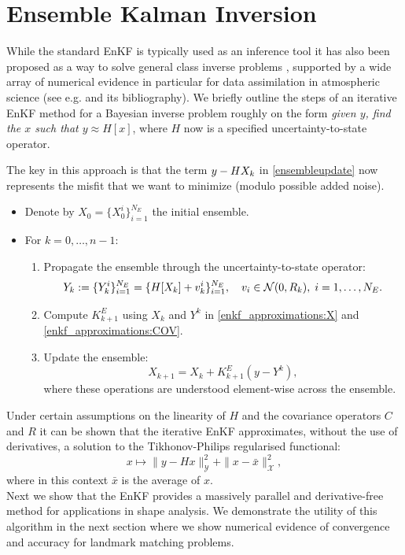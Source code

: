 \section{Ensemble Kalman Inversion}

While the standard EnKF is typically used as an inference tool it has also been proposed as a way to 
solve general class inverse problems
\cite{oliver2008inverse,iglesias2013ensemble,iglesias2016regularizing,chada2018parameterizations,schillings2017analysis}, supported by a wide array of numerical evidence in particular for data assimilation in atmospheric science (see e.g. \cite{schneider2017earth} and its bibliography). We briefly outline the steps of an iterative EnKF method for a Bayesian inverse problem roughly on the form \emph{given $y$, find the $x$ such that $y \approx H[x]$}, where $H$ now is a specified uncertainty-to-state operator. {The key in this approach is that the term $y - H X_k$ in \eqref{ensembleupdate} now represents the misfit that we want to minimize (modulo possible added noise).
\begin{itemize}
    \item Denote by $X_0 = \{X_0^i\}_{i=1}^{N_E}$ the initial ensemble.
    \item For $k=0,\ldots,n-1$:
\begin{enumerate}
    \item Propagate the ensemble through the uncertainty-to-state operator:
    \begin{align} Y_k := \{Y_k^i\}_{i=1}^{N_E} = \{H[X_k] + v_k^i\}_{i=1}^{N_E}, \quad v_i \in \mathcal{N}(0, R_k),\; i=1,\ldots,N_E.\label{eq:Yk}
    \end{align}
    \item Compute $K_{k+1}^E$ using $X_k$ and $Y^k$ in \eqref{enkf_approximations:X} and \eqref{enkf_approximations:COV}.
    \item Update the ensemble: \[ X_{k+1} = X_k + K_{k+1}^E (y - Y^k),\] where these operations are understood element-wise across the ensemble.
\end{enumerate}
\end{itemize}
}
Under certain assumptions on the linearity of $H$ and the covariance operators $C$ and $R$ it can be shown \cite[Section 2.6]{iglesias2013ensemble} that the iterative EnKF approximates, without the use of derivatives, a solution to the Tikhonov-Philips \cite{vogel2002computational} regularised functional:
\[
x\mapsto \| y - H x \|_\mathcal{Y}^2 + \| x - \bar{x} \|_\mathcal{X}^2,
\]
where in this context $\bar{x}$ is the average of $x$.\\

Next we show that the EnKF provides a massively parallel and derivative-free method for applications in shape analysis. We demonstrate the utility of this algorithm in the next section where we show numerical evidence of convergence and accuracy for landmark matching problems.

    